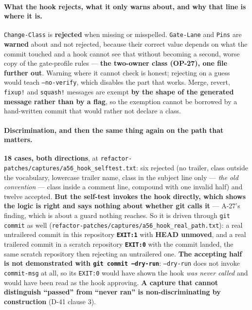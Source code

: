 \documentclass[
  10pt,
]{article}
\begin{document}
\paragraph{What the hook rejects, what it only warns about, and why that line is where it is.}
\texttt{Change-Class} is \textbf{rejected} when missing or misspelled.
\texttt{Gate-Lane} and \texttt{Pins} are \textbf{warned} about and not rejected,
because their correct value depends on what the commit touched and a hook cannot
see that without becoming a second, worse copy of the gate-profile rules ---
\textbf{the two-owner class (OP-27), one file further out}. Warning where it
cannot check is honest; rejecting on a guess would teach \texttt{--no-verify},
which disables the part that works. Merge, revert, \texttt{fixup!} and
\texttt{squash!} messages are exempt \textbf{by the shape of the generated
message rather than by a flag}, so the exemption cannot be borrowed by a
hand-written commit that would rather not declare a class.

\paragraph{Discrimination, and then the same thing again on the path that matters.}
\textbf{18 cases, both directions}, at
\texttt{refactor-patches/captures/a56\_hook\_selftest.txt}: six rejected (no
trailer, class outside the vocabulary, lowercase trailer name, class in the
subject line only --- \emph{the old convention} --- class inside a comment line,
compound with one invalid half) and twelve accepted. \textbf{But the self-test
invokes the hook directly, which shows the logic is right and says nothing
about whether git calls it} --- A-27's finding, which is about a guard nothing
reaches. So it is driven through \texttt{git commit} as well
(\texttt{refactor-patches/captures/a56\_hook\_real\_path.txt}): a real
untrailered commit in this repository \textbf{\texttt{EXIT:1}} with
\textbf{HEAD unmoved}, and a real trailered commit in a scratch repository
\textbf{\texttt{EXIT:0}} with the commit landed, the same scratch repository
then rejecting an untrailered one. \textbf{The accepting half is not
demonstrated with \texttt{git commit --dry-run}}: \texttt{--dry-run} does not
invoke \texttt{commit-msg} at all, so its \texttt{EXIT:0} would have shown the
hook \emph{was never called} and would have been read as the hook approving.
\textbf{A capture that cannot distinguish ``passed'' from ``never ran'' is
non-discriminating by construction} (D-41 clause 3).
\end{document}
